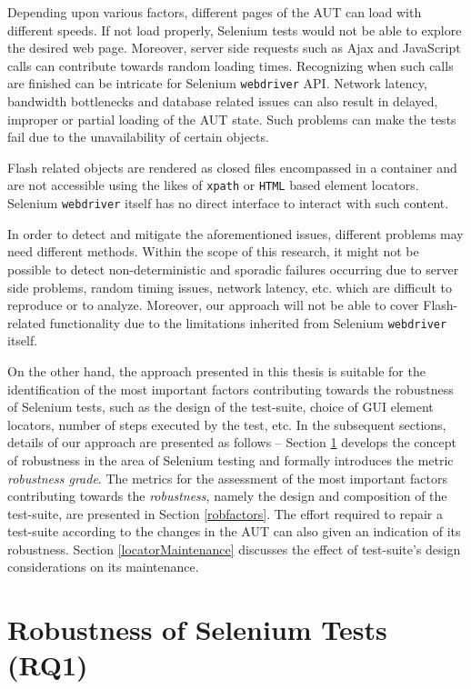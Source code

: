 Depending upon various factors, different pages of the AUT can load with different speeds. If not load properly, Selenium tests would not be able to explore the desired web page. Moreover, server side requests such as Ajax and JavaScript calls can contribute towards random loading times. Recognizing when such calls are finished can be intricate for Selenium \texttt{webdriver} API. Network latency, bandwidth bottlenecks and database related issues can also result in delayed, improper or partial loading of the AUT state. Such problems can make the tests fail due to the unavailability of certain objects.

Flash related objects are rendered as closed files encompassed in a container and are not accessible using the likes of \texttt{xpath} or \texttt{HTML} based element locators. Selenium \texttt{webdriver} itself has no direct interface to interact with such content. 

In order to detect and mitigate the aforementioned issues, different problems may need different methods. Within the scope of this research, it might not be possible to detect non-deterministic and sporadic failures occurring due to server side problems, random timing issues, network latency, etc. which are difficult to reproduce or to analyze. Moreover, our approach will not be able to cover Flash-related functionality due to the limitations inherited from Selenium \texttt{webdriver} itself.

On the other hand, the approach presented in this thesis is suitable for the identification of the most important factors contributing towards the robustness of Selenium tests, such as the design of the test-suite, choice of GUI element locators, number of steps executed by the test, etc. In the subsequent sections, details of our approach are presented as follows -- Section \ref{robustnessOfSeleniumTests} develops the concept of robustness in the area of Selenium testing and formally introduces the metric \textit{robustness grade}. The metrics for the assessment of the most important factors contributing towards the \textit{robustness}, namely the design and composition of the test-suite, are presented in Section \ref{robfactors}. The effort required to repair a test-suite according to the changes in the AUT can also given an indication of its robustness. Section \ref{locatorMaintenance} discusses the effect of test-suite's design considerations on its maintenance. 

\section{Robustness of Selenium Tests (RQ1)}
\label{robustnessOfSeleniumTests}

